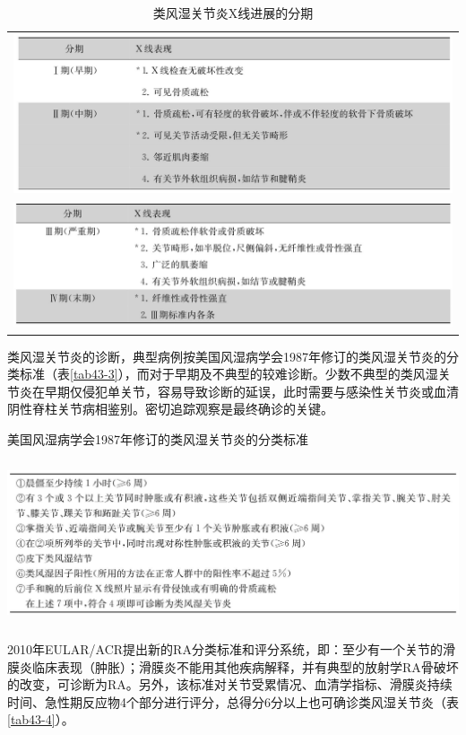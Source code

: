 \begin{longtable}{c}
 \caption{类风湿关节炎X线进展的分期}
 \label{tab43-2}
 \endfirsthead
 \caption[]{类风湿关节炎X线进展的分期}
 \endhead
 \includegraphics[width=\textwidth,height=\textheight,keepaspectratio]{./images/Image00257.jpg}\\
 \includegraphics[width=\textwidth,height=\textheight,keepaspectratio]{./images/Image00258.jpg}
 \end{longtable}

类风湿关节炎的诊断，典型病例按美国风湿病学会1987年修订的类风湿关节炎的分类标准（表\ref{tab43-3}），而对于早期及不典型的较难诊断。少数不典型的类风湿关节炎在早期仅侵犯单关节，容易导致诊断的延误，此时需要与感染性关节炎或血清阴性脊柱关节病相鉴别。密切追踪观察是最终确诊的关键。

\begin{table}[htbp]
\centering
\caption{美国风湿病学会1987年修订的类风湿关节炎的分类标准}
\label{tab43-3}
\includegraphics[width=5.89583in,height=1.89583in]{./images/Image00259.jpg}
\end{table}

2010年EULAR/ACR提出新的RA分类标准和评分系统，即：至少有一个关节的滑膜炎临床表现（肿胀）；滑膜炎不能用其他疾病解释，并有典型的放射学RA骨破坏的改变，可诊断为RA。另外，该标准对关节受累情况、血清学指标、滑膜炎持续时间、急性期反应物4个部分进行评分，总得分6分以上也可确诊类风湿关节炎（表\ref{tab43-4}）。

